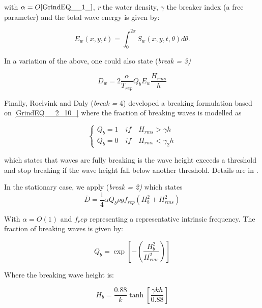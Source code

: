 with $\alpha =O\eqref{GrindEQ__1_}$, \textit{r} the water density, $\gamma $ the breaker index (a free parameter) and the total wave energy is given by:

\begin{equation} \label{2.9)} 
E_{w} (x,y,t)=\int _{0}^{2\pi }S_{w} (x,y,t,\theta )d\theta  .  
\end{equation} 

In a variation of the above, one could also state (\textit{break = 3)}

\begin{equation} \label{2.10)} 
\bar{D}_{w} =2\frac{\alpha }{T_{rep} } Q_{b} E_{w} \frac{H_{rms} }{h}  
\end{equation} 

Finally, Roelvink and Daly (\textit{break = }4) developed a breaking formulation based on \eqref{GrindEQ__2_10_} where the fraction of breaking waves is modelled as

\begin{equation} \label{2.11)} 
\left\{\begin{array}{l} {Q_{b} =1\quad if\quad H_{rms} >\gamma h} \\ {Q_{b} =0\quad if\quad H_{rms} <\gamma _{2} h} \end{array}\right.  
\end{equation} 

which states that waves are fully breaking is the wave height exceeds a threshold and stop breaking if the wave height fall below another threshold. Details are in \citet{DalyRoelvink2010}.

In the stationary case, we apply \citet{Baldock1998} (\textit{break = 2) } which states 
\begin{equation} \label{2.12)} 
\bar{D}=\frac{1}{4} \alpha Q_{b} \rho gf_{rep} \left(H_{b}^{2} +H_{rms}^{2} \right) 
\end{equation} 

With $\alpha = O(1)$ and $f_rep$ representing a representative intrinsic frequency. The fraction of breaking waves is given by:

\begin{equation} \label{2.13)} 
Q_{b} =\exp \left[-\left(\frac{H_{b}^{2} }{H_{rms}^{2} } \right)\right] 
\end{equation} 

Where the breaking wave height is:

\begin{equation} \label{2.14)} 
H_{b} =\frac{0.88}{k} \tanh \left[\frac{\gamma kh}{0.88} \right] 
\end{equation} 

